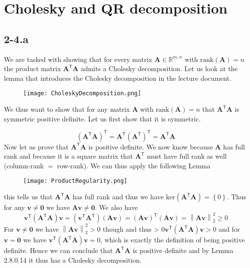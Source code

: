 \documentclass{article}
\newcommand\tr{\mathsf{T}}
\begin{document}
\section*{Cholesky and QR decomposition}
\subsection*{2-4.a}
We are tasked with showing that for every matrix $\mathbf{A} \in \mathbb{R}^{m,n}$ with $\text{rank}\left(\mathbf{A}\right) = n$ the product matrix $\mathbf{A}^{\tr}\mathbf{A}$ admits a Cholesky decomposition. Let us look at the lemma that introduces the Cholesky decomposition in the lecture document.

\begin{figure}[!hbt]
    \centering
\texttt{[image: CholeskyDecomposition.png]}
\end{figure}

\noindent We thus want to show that for any matrix $\mathbf{A}$ with $\text{rank}\left(\mathbf{A}\right) = n$ that  $\mathbf{A}^{\tr}\mathbf{A}$ is symmetric positive definite. Let us first show that it is symmetric.

\begin{equation*}
    \left(\mathbf{A}^{\tr}\mathbf{A}\right)^{\tr} = \mathbf{A}^{\tr}\left(\mathbf{A}^{\tr}\right)^{\tr} = \mathbf{A}^{\tr}\mathbf{A}
\end{equation*}
Now let us prove that $\mathbf{A}^{\tr}\mathbf{A}$ is positive definite. We now know because $\mathbf{A}$ has full rank and because it is a square matrix that $\mathbf{A}^{\tr}$ must have full rank as well (column-rank $=$ row-rank). We can thus apply the following Lemma
\begin{figure}[!hbt]
    \centering
\texttt{[image: ProductRegularity.png]}
\end{figure}
this tells us that $\mathbf{A}^{\tr}\mathbf{A}$ has full rank and thus we have $\text{ker}\left(\mathbf{A}^{\tr}\mathbf{A}\right) = \left\{0\right\}$. Thus for any $\mathbf{v}\neq \mathbf{0}$ we have $\mathbf{A}\mathbf{v} \neq \mathbf{0}$. We also have
\begin{equation*}
    \mathbf{v}^{\tr}\left(\mathbf{A}^{\tr}\mathbf{A}\right)\mathbf{v} = \left(\mathbf{v}^{\tr}\mathbf{A}^{\tr}\right)\left(\mathbf{A}\mathbf{v}\right) = \left(\mathbf{A}\mathbf{v}\right)^{\tr}\left(\mathbf{A}\mathbf{v}\right) = \left\lVert \mathbf{A}\mathbf{v}\right\rVert_{2}^{2} \geq 0
\end{equation*}
For $\mathbf{v}\neq \mathbf{0}$ we have $\left\lVert \mathbf{A}\mathbf{v}\right\rVert_{2}^{2} > 0$ though and thus 
 > 0$\mathbf{v}^{\tr}\left(\mathbf{A}^{\tr}\mathbf{A}\right)\mathbf{v}
 > 0$ and for $\mathbf{v} = \mathbf{0}$ we have $\mathbf{v}^{\tr}\left(\mathbf{A}^{\tr}\mathbf{A}\right)\mathbf{v}
 = 0$, which is exactly the definition of being positive definite. Hence we can conclude that  $\mathbf{A}^{\tr}\mathbf{A}$ is positive definite and by Lemma 2.8.0.14 it thus has a Cholesky decomposition.
\end{document}
